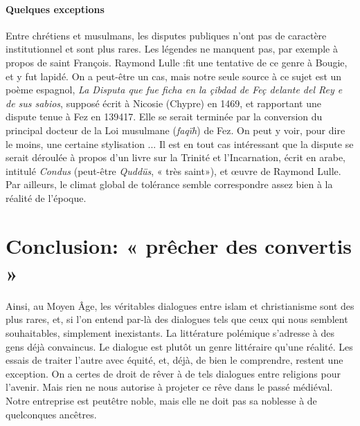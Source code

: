 \paragraph{Quelques exceptions}
Entre chrétiens et musulmans, les disputes publiques n'ont pas
de caractère institutionnel et sont plus rares. Les légendes ne manquent pas, par exemple à propos de saint François. Raymond Lulle
:fit une tentative de ce genre à Bougie, et y fut lapidé. On a peut-être un cas, mais notre seule source à ce sujet est un poème espagnol,\textit{ La Disputa que fue ficha en la çibdad de Feç delante del Rey e de sus sabios}, supposé écrit à Nicosie (Chypre) en 1469, et rapportant une dispute tenue à Fez en 139417. Elle se serait terminée par la conversion du principal docteur de la Loi musulmane (\textit{faqïh}) de Fez. On peut y voir, pour dire le moins, une certaine stylisation ... Il est en tout cas
intéressant que la dispute se serait déroulée à propos d'un livre sur la Trinité et l'Incarnation, écrit en arabe, intitulé \textit{Condus} (peut-être \textit{Quddüs}, « très saint»), et œuvre de Raymond Lulle. Par ailleurs, le climat global de tolérance semble correspondre assez bien à la réalité de l'époque.


\section{Conclusion: « prêcher des convertis »}

Ainsi, au Moyen Âge, les véritables dialogues entre islam et christianisme sont des plus rares, et, si l'on entend par-là des dialogues tels que ceux qui nous semblent souhaitables, simplement inexistants. La littérature polémique s'adresse à des gens déjà convaincus. Le dialogue est plutôt un genre littéraire qu'une réalité. Les essais de traiter l'autre avec équité, et, déjà, de bien le comprendre, restent une exception. On a certes de droit de rêver à de tels dialogues entre religions pour l'avenir. Mais rien ne nous autorise à projeter ce rêve dans le passé médiéval. Notre entreprise est peutêtre noble, mais elle ne doit pas sa noblesse à de quelconques ancêtres.


